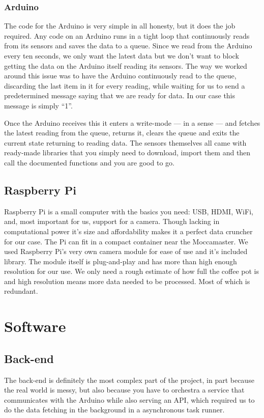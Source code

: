 \documentclass[12pt,a4paper,oneside,article]{memoir}
\numberwithin{equation}{chapter}
\begin{document}
\subsubsection{Arduino}\label{sec:arduino}
The code for the Arduino is very simple in all honesty, but it does the job
required. Any code on an Arduino runs in a tight loop that continuously reads
from its sensors and saves the data to a queue. Since we read from the Arduino
every ten seconds, we only want the latest data but we don't want to block
getting the data on the Arduino itself reading its sensors. The way we worked
around this issue was to have the Arduino continuously read to the queue,
discarding the last item in it for every reading, while waiting for us to send a
predetermined message saying that we are ready for data. In our case this
message is simply ``1''.

Once the Arduino receives this it enters a write-mode --- in a sense --- and
fetches the latest reading from the queue, returns it, clears the queue and
exits the current state returning to reading data. The sensors themselves all
came with ready-made libraries that you simply need to download, import them and
then call the documented functions and you are good to go.


\subsection{Raspberry Pi}\label{sec:raspberry-pi}
Raspberry Pi is a small computer with the basics you need: USB, HDMI, WiFi,
and, most important for us, support for a camera. Though lacking in 
computational power it's size and affordability makes it a perfect data 
cruncher for our case. The Pi can fit in a compact container near the 
Moccamaster. We used Raspberry Pi's very own camera module for ease of use and 
it's included library. The module itself is plug-and-play and has more than high 
enough resolution for our use. We only need a rough estimate of how full the 
coffee pot is and high resolution means more data needed to be processed. Most 
of which is redundant. 

\section{Software}\label{sec:software}
\subsection{Back-end}\label{sec:back-end}
The back-end is definitely the most complex part of the project, in part because
the real world is messy, but also because you have to orchestra a service that
communicates with the Arduino while also serving an API, which required us to do
the data fetching in the background in a asynchronous task runner.
\end{document}
